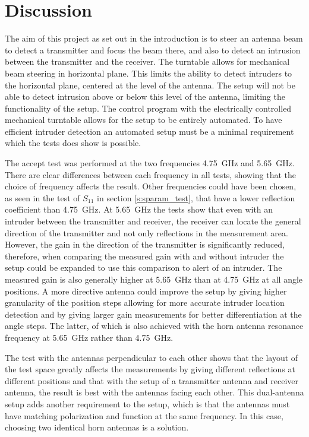 \chapter{Discussion}
The aim of this project as set out in the introduction is to steer an antenna beam to detect a transmitter and focus the beam there, and also to detect an intrusion between the transmitter and the receiver. The turntable allows for mechanical beam steering in horizontal plane. This limits the ability to detect intruders to the horizontal plane, centered at the level of the antenna. The setup will not be able to detect intrusion above or below this level of the antenna, limiting the functionality of the setup. The control program with the electrically controlled mechanical turntable allows for the setup to be entirely automated. To have efficient intruder detection an automated setup must be a minimal requirement which the tests does show is possible.

The accept test was performed at the two frequencies \SI{4.75}{\giga\hertz} and \SI{5.65}{\giga\hertz}. There are clear differences between each frequency in all tests, showing that the choice of frequency affects the result. Other frequencies could have been chosen, as seen in the test of $S_{11}$ in section \ref{s:sparam_test}, that have a lower reflection coefficient than \SI{4.75}{\giga\hertz}. At \SI{5.65}{\giga\hertz} the tests show that even with an intruder between the transmitter and receiver, the receiver can locate the general direction of the transmitter and not only reflections in the measurement area. However, the gain in the direction of the transmitter is significantly reduced, therefore, when comparing the measured gain with and without intruder the setup could be expanded to use this comparison to alert of an intruder. The measured gain is also generally higher at \SI{5.65}{\giga\hertz} than at \SI{4.75}{\giga\hertz} at all angle positions. A more directive antenna could improve the setup by giving higher granularity of the position steps allowing for more accurate intruder location detection and by giving larger gain measurements for better differentiation at the angle steps. The latter, of which is also achieved with the horn antenna resonance frequency at \SI{5.65}{\giga\hertz} rather than \SI{4.75}{\giga\hertz}.

The test with the antennas perpendicular to each other shows that the layout of the test space greatly affects the measurements by giving different reflections at different positions and that with the setup of a transmitter antenna and receiver antenna, the result is best with the antennas facing each other. This dual-antenna setup adds another requirement to the setup, which is that the antennas must have matching polarization and function at the same frequency. In this case, choosing two identical horn antennas is a solution. 

